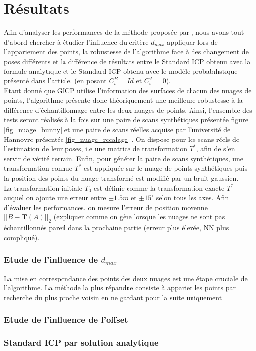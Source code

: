 \section{Résultats}
Afin d'analyser les performances de la méthode proposée par \cite{bib_gicp}, nous avons tout d'abord chercher à étudier l'influence du critère $d_{max}$ appliquer lors de l'appariement des points, la robustesse de l'algorithme face à des changement de poses différents et la différence de résultats entre le Standard ICP obtenu avec la formule analytique et le Standard ICP obtenu avec le modèle probabilistique présenté dans l'article. (en posant $C_{i}^B=Id$ et $C_{i}^A=0$).\\

Etant donné que GICP utilise l'information des surfaces de chacun des nuages de points, l'algorithme présente donc théoriquement une meilleure robustesse à la différence d'échantillonnage entre les deux nuages de points. Ainsi, l'ensemble des tests seront réalisés à la fois sur une paire de scans synthétiques présentée figure \ref{fig_nuage_bunny} et une paire de scans réelles acquise par l'université de Hannovre présentée \ref{fig_nuage_recalage} . On dispose pour les scans réels de l'estimation de leur poses, i.e une matrice de transformation $T^*$, afin de s'en servir de vérité terrain. Enfin, pour générer la paire de scans synthétiques, une transformation connue $T^{*}$ est appliquée sur le nuage de points synthétiques puis la position des points du nuage transformé est modifié par un bruit gaussien.\\

La transformation initiale $T_0$ est définie comme la transformation exacte $T^*$ auquel on ajoute une erreur entre $\pm1.5m$ et $\pm15^{\circ}$ selon tous les axes. Afin d'évaluer les performances, on mesure l'erreur de position moyenne $||B - \mathbf{T}(A)||_2$ (expliquer comme on gère lorsque les nuages ne sont pas échantillonnés pareil dans la prochaine partie (erreur plus élevée, NN plus compliqué). 
\subsubsection{Etude de l'influence de $d_{max}$}
La mise en correspondance des points des deux nuages est une étape cruciale de l'algorithme. La méthode la plus répandue consiste à apparier les points par recherche du plus proche voisin en ne gardant pour la suite uniquement 
\subsubsection{Etude de l'influence de l'offset}
\subsubsection{Standard ICP par solution analytique}